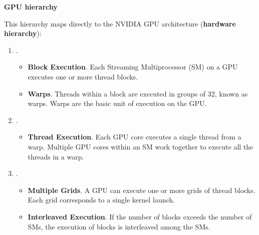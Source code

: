 \highspace
\begin{flushleft}
    \textcolor{Green3}{ \textbf{GPU hierarchy}}
\end{flushleft}
This hierarchy maps directly to the NVIDIA GPU architecture (\textbf{hardware hierarchy}):
\begin{enumerate}
	\item {}.
	\begin{itemize}
		\item \textbf{Block Execution}. Each Streaming Multiprocessor (SM) on a GPU executes one or more thread blocks.
		\item \textbf{Warps}. Threads within a block are executed in groups of 32, known as warps. Warps are the basic unit of execution on the GPU.
	\end{itemize}

	\item {}.
	\begin{itemize}
		\item \textbf{Thread Execution}. Each GPU core executes a single thread from a warp. Multiple GPU cores within an SM work together to execute all the threads in a warp.
	\end{itemize}

	\item {}.
	\begin{itemize}
		\item \textbf{Multiple Grids}. A GPU can execute one or more grids of thread blocks. Each grid corresponds to a single kernel launch.
		\item \textbf{Interleaved Execution}. If the number of blocks exceeds the number of SMs, the execution of blocks is interleaved among the SMs.
	\end{itemize}
\end{enumerate}

